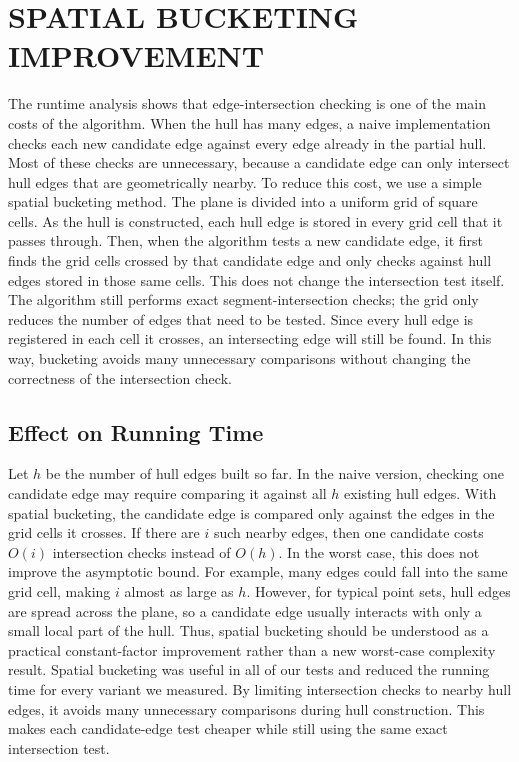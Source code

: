 \documentclass[a4paper,twoside]{article}
\begin{document}
\section{\uppercase{Spatial Bucketing Improvement}}
The runtime analysis shows that edge-intersection checking is one of the main
costs of the algorithm. When the hull has many edges, a naive implementation checks
each new candidate edge against every edge already in the partial hull. Most of these
checks are unnecessary, because a candidate edge can only intersect hull edges that are
geometrically nearby.
To reduce this cost, we use a simple spatial bucketing method. The plane is divided
into a uniform grid of square cells. As the hull is constructed, each hull edge is
stored in every grid cell that it passes through. Then, when the algorithm tests a new
candidate edge, it first finds the grid cells crossed by that candidate edge and only
checks against hull edges stored in those same cells.
This does not change the intersection test itself. The algorithm still performs exact
segment-intersection checks; the grid only reduces the number of edges that need to be
tested. Since every hull edge is registered in each cell it crosses, an intersecting
edge will still be found. In this way, bucketing avoids many unnecessary comparisons
without changing the correctness of the intersection check.
\subsection{Effect on Running Time}
Let $h$ be the number of hull edges built so far. In the naive
version, checking one candidate edge may require comparing
it against all $h$ existing hull edges. With spatial bucketing,
the candidate edge is compared only against the edges in the
grid cells it crosses. If there are $i$ such nearby edges, then one
candidate costs $O(i)$ intersection checks instead of $O(h)$.
In the worst case, this does not improve the asymptotic
bound. For example, many edges could fall into the same
grid cell, making $i$ almost as large as $h$. However, for
typical point sets, hull edges are spread across the plane, so a
candidate edge usually interacts with only a small local part
of the hull. Thus, spatial bucketing should be understood
as a practical constant-factor improvement rather than a new
worst-case complexity result.
Spatial bucketing was useful in all of our tests and reduced the running time for every variant we measured. By limiting intersection checks to nearby hull edges, it avoids many unnecessary comparisons during hull construction. This makes each candidate-edge test cheaper while still using the same exact intersection test.
\end{document}
